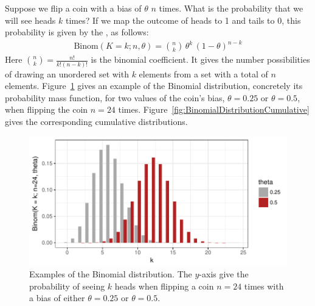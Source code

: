 \documentclass[nobib,nofonts]{tufte-handout}
\begin{document}
\begin{example}
  Suppose we flip a coin with a bias of $\theta$ $n$ times. What is the probability that we
  will see heads $k$ times? If we map the outcome of heads to 1 and tails to 0, this
  probability is given by the , as follows:
  \begin{align*}
    \text{Binom}(K = k ; n, \theta) = \binom{n}{k} \,  \theta^{k} \, (1-\theta)^{n-k}
  \end{align*}
  Here $\binom{n}{k} = \frac{n!}{k!(n-k)!}$ is the binomial coefficient. It gives the number
  possibilities of drawing an unordered set with $k$ elements from a set with a total of $n$
  elements. Figure~\ref{fig:BinomialDistribution} gives an example of the Binomial
  distribution, concretely its probability mass function, for two values of the coin's bias,
  $\theta = 0.25$ or $\theta = 0.5$, when flipping the coin $n=24$
  times. Figure~\ref{fig:BinomialDistributionCumulative} gives the corresponding cumulative
  distributions.

\begin{figure}
  \centering
  \includegraphics[width=\textwidth]{00-pics/05_00_binomial-distribution.pdf}
  \caption{Examples of the Binomial distribution. The $y$-axis give the probability of seeing
    $k$ heads when flipping a coin $n=24$ times with a bias of either $\theta = 0.25$ or
    $\theta = 0.5$.}
  \label{fig:BinomialDistribution}
\end{figure}


\end{example}
\end{document}
